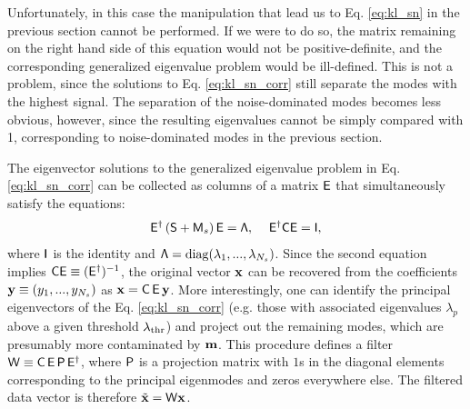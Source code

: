 \documentclass[twocolumn,amsfont,amssymb,amsmath, showpacs,balancelastpage, nofootinbib]{revtex4-1}
\begin{document}
      Unfortunately, in this case the manipulation that lead us to Eq. \ref{eq:kl_sn} in the previous section cannot be performed. If we were to do so, the matrix remaining on the right hand side of this equation would not be positive-definite, and the corresponding generalized eigenvalue problem would be ill-defined. This is not a problem, since the solutions to Eq. \ref{eq:kl_sn_corr} still separate the modes with the highest signal. The separation of the noise-dominated modes becomes less obvious, however, since the resulting eigenvalues cannot be simply compared with 1, corresponding to noise-dominated modes in the previous section.
      
      The eigenvector solutions to the generalized eigenvalue problem in Eq. \ref{eq:kl_sn_corr} can be collected as columns of a matrix ${\sf E}$ that simultaneously satisfy the equations:
      \begin{equation}
        {\sf E}^\dag\left({\sf S}+{\sf M}_s\right){\sf E}={\sf \Lambda},
        \hspace{12pt}
        {\sf E}^\dag{\sf C}{\sf E}={\sf I},
      \end{equation}
      where ${\sf I}$ is the identity and ${\sf \Lambda}={\rm diag}(\lambda_1,...,\lambda_{N_s})$.
      Since the second equation implies ${\sf C}{\sf E}\equiv({\sf E}^\dag)^{-1}$, the original vector ${\bf x}$ can be recovered from the coefficients ${\bf y}\equiv(y_1,...,y_{N_s})$ as ${\bf x}={\sf C}\,{\sf E}\,{\bf y}$. More interestingly, one can identify the principal eigenvectors of the Eq. \ref{eq:kl_sn_corr} (e.g. those with associated eigenvalues $\lambda_p$ above a given threshold $\lambda_{\rm thr}$) and project out the remaining modes, which are presumably more contaminated by ${\bf m}$. This procedure defines a filter ${\sf W}\equiv{\sf C}\,{\sf E}\,{\sf P}\,{\sf E}^\dag$, where ${\sf P}$ is a projection matrix with $1$s in the diagonal elements corresponding to the principal eigenmodes and zeros everywhere else. The filtered data vector is therefore $\tilde{\bf x}={\sf W}{\bf x}$.
\end{document}
